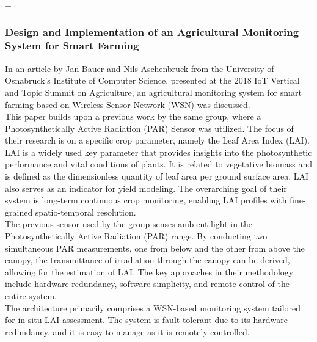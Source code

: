 =\documentclass[12pt, a4paper]{article}
\begin{document}
\subsubsection{Design and Implementation of an Agricultural Monitoring System for Smart Farming}
In an article by Jan Bauer and Nils Aschenbruck \cite{8373022} from the University of Osnabruck's Institute of Computer Science, presented at the 2018 IoT Vertical and Topic Summit on Agriculture, an agricultural monitoring system for smart farming based on Wireless Sensor Network (WSN) was discussed.\\
This paper builds upon a previous work by the same group, where a Photosynthetically Active Radiation (PAR) Sensor was utilized. The focus of their research is on a specific crop parameter, namely the Leaf Area Index (LAI). LAI is a widely used key parameter that provides insights into the photosynthetic performance and vital conditions of plants. It is related to vegetative biomass and is defined as the dimensionless quantity of leaf area per ground surface area. LAI also serves as an indicator for yield modeling. The overarching goal of their system is long-term continuous crop monitoring, enabling LAI profiles with fine-grained spatio-temporal resolution.\\
The previous sensor used by the group senses ambient light in the Photosynthetically Active Radiation (PAR) range. By conducting two simultaneous PAR measurements, one from below and the other from above the canopy, the transmittance of irradiation through the canopy can be derived, allowing for the estimation of LAI. The key approaches in their methodology include hardware redundancy, software simplicity, and remote control of the entire system.\\
The architecture primarily comprises a WSN-based monitoring system tailored for in-situ LAI assessment. The system is fault-tolerant due to its hardware redundancy, and it is easy to manage as it is remotely controlled.
\end{document}
